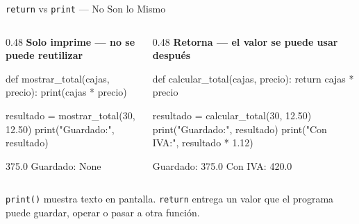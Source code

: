 \documentclass[aspectratio=169, 11pt]{beamer}
\begin{document}
\begin{frame}[fragile,shrink=25]{\texttt{return} vs \texttt{print} --- No Son lo Mismo}
  \vspace{-6pt}
  \begin{columns}[T]
    \begin{column}{0.48\textwidth}
      {\scriptsize\color{arcaRed}\bfseries\faExclamationTriangle\hspace{4pt}
        Solo imprime --- no se puede reutilizar}
      \begin{pyblock}
def mostrar_total(cajas, precio):
    print(cajas * precio)

resultado = mostrar_total(30, 12.50)
print("Guardado:", resultado)
      \end{pyblock}
      \vspace{-2pt}
      \begin{outputblock}
375.0
Guardado: None
      \end{outputblock}
    \end{column}

    \begin{column}{0.48\textwidth}
      {\scriptsize\color{codeGreen}\bfseries\faCheckCircle\hspace{4pt}
        Retorna --- el valor se puede usar después}
      \begin{pyblock}
def calcular_total(cajas, precio):
    return cajas * precio

resultado = calcular_total(30, 12.50)
print("Guardado:", resultado)
print("Con IVA:", resultado * 1.12)
      \end{pyblock}
      \vspace{-2pt}
      \begin{outputblock}
Guardado: 375.0
Con IVA: 420.0
      \end{outputblock}
    \end{column}
  \end{columns}

  \vspace{4pt}
  {\footnotesize\color{arcaDark}
    \texttt{print()} muestra texto en pantalla.
    \texttt{return} entrega un valor que el programa puede
    guardar, operar o pasar a otra función.}
\end{frame}
\end{document}
